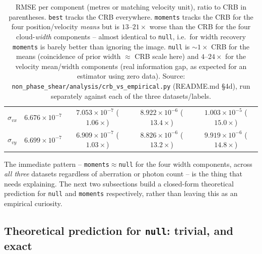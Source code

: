\documentclass[11pt,a4paper]{article}
\newcommand{\code}[1]{\texttt{#1}}
\begin{document}
\begin{table}[h]
\begin{tabular}{lcccc}
$\sigma_{vx}$ & $6.676\times10^{-7}$ & $7.053\times10^{-7}$ ($1.06\times$) & $8.922\times10^{-6}$ ($\mathbf{13.4\times}$) & $1.003\times10^{-5}$ ($\mathbf{15.0\times}$) \\
$\sigma_{vy}$ & $6.699\times10^{-7}$ & $6.909\times10^{-7}$ ($1.03\times$) & $8.826\times10^{-6}$ ($\mathbf{13.2\times}$) & $9.919\times10^{-6}$ ($\mathbf{14.8\times}$) \\
\bottomrule
\end{tabular}
\caption{RMSE per component (metres or matching velocity unit), ratio to CRB
in parentheses. \code{best} tracks the CRB everywhere. \code{moments} tracks
the CRB for the four position/velocity \emph{means} but is $13$--$21\times$
worse than the CRB for the four cloud-\emph{width} components -- almost
identical to \code{null}, i.e.\ for width recovery \code{moments} is barely
better than ignoring the image. \code{null} is $\sim1\times$ CRB for the
means (coincidence of prior width $\approx$ CRB scale here) and $4$--$24\times$
for the velocity mean/width components (real information gap, as expected
for an estimator using zero data). Source:
\code{non\_phase\_shear/analysis/crb\_vs\_empirical.py} (README.md \S4d),
run separately against each of the three datasets/labels.}
\label{tab:spectrum}
\end{table}

The immediate pattern -- \code{moments}$\approx$\code{null} for the four
width components, across \emph{all three} datasets regardless of aberration
or photon count -- is the thing that needs explaining. The next two
subsections build a closed-form theoretical prediction for \code{null} and
\code{moments} respectively, rather than leaving this as an empirical
curiosity.

\subsection{Theoretical prediction for \code{null}: trivial, and exact}
\label{sec:null-theory}
\end{document}
